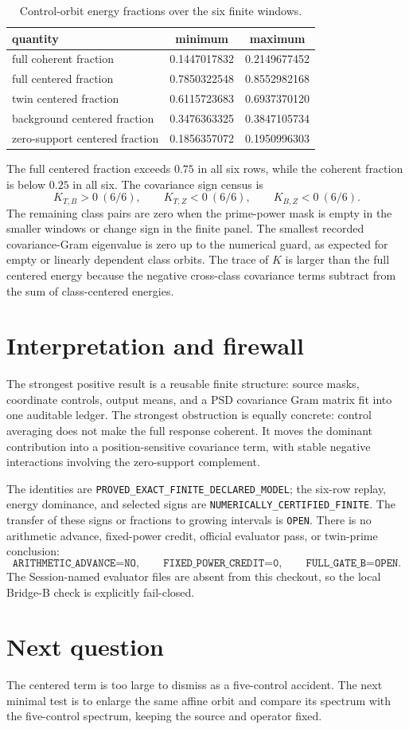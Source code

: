 \documentclass[10pt]{article}
\begin{document}
\begin{table}[ht]
\centering\small
\caption{Control-orbit energy fractions over the six finite windows.}
\label{tab:fractions}
\begin{tabular}{lcc}
\toprule
quantity & minimum & maximum\\
\midrule
full coherent fraction & 0.1447017832 & 0.2149677452\\
full centered fraction & 0.7850322548 & 0.8552982168\\
twin centered fraction & 0.6115723683 & 0.6937370120\\
background centered fraction & 0.3476363325 & 0.3847105734\\
zero-support centered fraction & 0.1856357072 & 0.1950996303\\
\bottomrule
\end{tabular}
\end{table}

The full centered fraction exceeds $0.75$ in all six rows, while the coherent
fraction is below $0.25$ in all six.  The covariance sign census is
\[
 K_{T,B}>0\ (6/6),\qquad K_{T,Z}<0\ (6/6),\qquad
 K_{B,Z}<0\ (6/6).
\]
The remaining class pairs are zero when the prime-power mask is empty in the
smaller windows or change sign in the finite panel.  The smallest recorded
covariance-Gram eigenvalue is zero up to the numerical guard, as expected for
empty or linearly dependent class orbits.  The trace of $K$ is larger than the
full centered energy because the negative cross-class covariance terms subtract
from the sum of class-centered energies.

\section{Interpretation and firewall}

The strongest positive result is a reusable finite structure: source masks,
coordinate controls, output means, and a PSD covariance Gram matrix fit into
one auditable ledger.  The strongest obstruction is equally concrete:
control averaging does not make the full response coherent.  It moves the
dominant contribution into a position-sensitive covariance term, with stable
negative interactions involving the zero-support complement.

The identities are
\texttt{PROVED\_EXACT\_FINITE\_DECLARED\_MODEL}; the six-row replay,
energy dominance, and selected signs are
\texttt{NUMERICALLY\_CERTIFIED\_FINITE}.  The transfer of these signs or
fractions to growing intervals is \texttt{OPEN}.  There is no arithmetic
advance, fixed-power credit, official evaluator pass, or twin-prime conclusion:
\[
 \texttt{ARITHMETIC\_ADVANCE=NO},\qquad
 \texttt{FIXED\_POWER\_CREDIT=0},\qquad
 \texttt{FULL\_GATE\_B=OPEN}.
\]
The Session-named evaluator files are absent from this checkout, so the local
Bridge-B check is explicitly fail-closed.

\section{Next question}

The centered term is too large to dismiss as a five-control accident.  The
next minimal test is to enlarge the same affine orbit and compare its spectrum
with the five-control spectrum, keeping the source and operator fixed.
\end{document}

